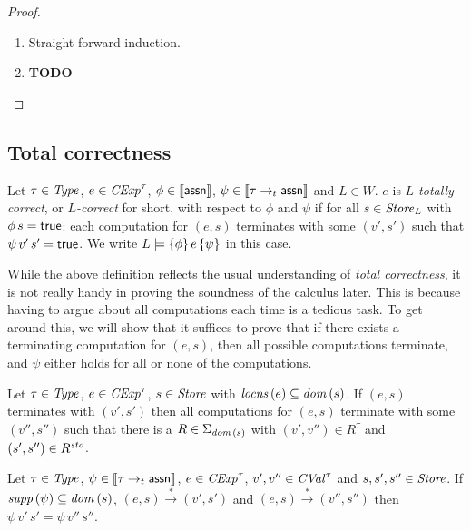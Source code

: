 \documentclass[12pt,a4paper]{report}
\newcommand{\CExp}{\nstyle{CExp}}
\newcommand{\CVal}{\nstyle{CVal}}
\newcommand{\sto}{\nstyle{sto}}
\begin{document}
\begin{proof} \
  \begin{enumerate}
    \item Straight forward induction.

    \item {\bf TODO}
  \end{enumerate}
\end{proof}



\subsection{Total correctness}

\begin{definition}
  Let $\tau\in\mathit{Type}$, $e\in\CExp^\tau$, $\phi\in\llbracket\mathsf{assn}\rrbracket$, $\psi\in\llbracket\tau\rightarrow_t\mathsf{assn}\rrbracket$
  and $L\in W$. $e$ is {\em $L$-totally correct}, or {\em $L$-correct} for short, with respect to $\phi$ and $\psi$ if for
  all $s\in\mathit{Store}_L$ with $\phi\,s=\mathsf{true}$: each computation for $(e,s)$ terminates with some
  $(v',s')$ such that $\psi\,v'\,s'=\mathsf{true}$. We write $L \models \{\phi\}\,e\,\{\psi\}$ in this case.
\end{definition}

While the above definition reflects the usual understanding of {\em total correctness}, it is not really handy
in proving the soundness of the calculus later. This is because having to argue about all computations each
time is a tedious task. To get around this, we will show that it suffices to prove that if there exists a
terminating computation for $(e,s)$, then all possible computations terminate, and $\psi$ either holds for all
or none of the computations.

\begin{lemma}
  Let $\tau\in\mathit{Type}$, $e \in \CExp^\tau$, $s\in\mathit{Store}$ with $\mathit{locns}\,(e) \subseteq \mathit{dom}\,(s)$.
  If $(e,s)$ terminates with $(v',s')$ then all computations for $(e,s)$ terminate with some
  $(v'',s'')$ such that there is a $R \in \Sigma_{\mathit{dom}\,(s)}$ with $(v',v'')\in R^\tau$ and $(s',s'') \in R^\sto$.
\end{lemma}

\begin{lemma}
  Let $\tau\in\mathit{Type}$, $\psi\in\llbracket\tau\rightarrow_t\mathsf{assn}\rrbracket$,
  $e\in\CExp^\tau$, $v',v''\in\CVal^\tau$ and $s,s',s''\in\mathit{Store}$.
  If $\mathit{supp}\,(\psi) \subseteq \mathit{dom}\,(s)$, $(e,s)\xrightarrow*(v',s')$
  and $(e,s)\xrightarrow*(v'',s'')$ then $\psi\,v'\,s'=\psi\,v''\,s''$.
\end{lemma}
\end{document}
